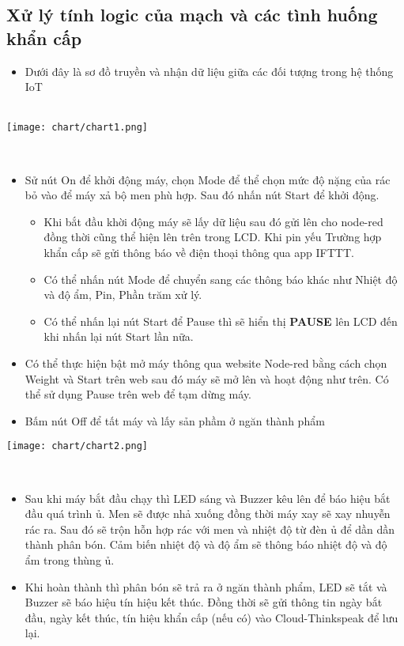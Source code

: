 \documentclass[12pt, a4paper]{article}
\begin{document}
\subsection{Xử lý tính logic của mạch và các tình huống khẩn cấp}
\begin{itemize}
    \item  Dưới đây là sơ đồ truyền và nhận dữ liệu giữa các đối tượng trong hệ thống IoT \\ \\
\end{itemize}
\centerline{\texttt{[image: chart/chart1.png]}} \\
\begin{itemize}
    \item Sử nút On để khởi động máy, chọn Mode để thể chọn mức độ nặng của rác bỏ vào để máy xả bộ men phù hợp. Sau đó nhấn nút Start để khởi động.
    \begin{itemize}
        \item Khi bắt đầu khời động máy sẽ lấy dữ liệu sau đó gửi lên cho node-red đồng thời cũng thể hiện lên trên trong LCD. Khi pin yếu Trường hợp khẩn cấp sẽ gửi thông báo về điện thoại thông qua app IFTTT. 
        \item Có thể nhấn nút Mode để chuyển sang các thông báo khác như Nhiệt độ và độ ẩm, Pin, Phần trăm xử lý.
        \item Có thể nhấn lại nút Start để Pause thì sẽ hiển thị \textbf{PAUSE} lên LCD đến khi nhấn lại nút Start lần nữa.
    \end{itemize}
    \item Có thể thực hiện bật mở máy thông qua website Node-red bằng cách chọn Weight và Start trên web sau đó máy sẽ mở lên và hoạt động như trên. Có thể sử dụng Pause trên web để tạm dừng máy.
    \item Bấm nút Off để tất máy và lấy sản phầm ở ngăn thành phẩm
\end{itemize}
\centerline{\texttt{[image: chart/chart2.png]}} \\
\begin{itemize}
    \item Sau khi máy bắt đầu chạy thì LED sáng và Buzzer kêu lên để báo hiệu bắt đầu quá trình ủ. Men sẽ được nhả xuống đồng thời máy xay sẽ xay nhuyễn rác ra. Sau đó sẽ trộn hỗn hợp rác với men và nhiệt độ từ đèn ủ để dần dần thành phân bón. Cảm biến nhiệt độ và độ ẩm sẽ thông báo nhiệt độ và độ ẩm trong thùng ủ.
    \item Khi hoàn thành thì phân bón sẽ trả ra ở ngăn thành phẩm, LED sẽ tắt và Buzzer sẽ báo hiệu tín hiệu kết thúc. Đồng thời sẽ gửi thông tin ngày bắt đầu, ngày kết thúc, tín hiệu khẩn cấp (nếu có) vào Cloud-Thinkspeak để lưu lại.
\end{itemize}
\end{document}
